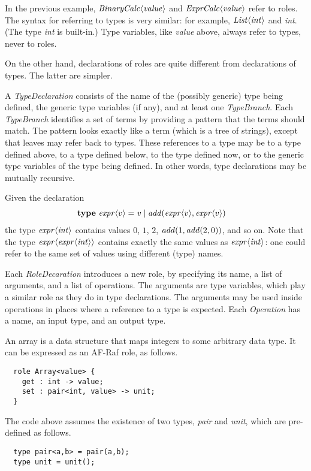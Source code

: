 \documentclass[a4paper,12pt,oneside,fleqn]{book} %
\begin{document}
\begin{example}
In the previous example, $\it BinaryCalc\langle value\rangle$ and $\it
ExprCalc\langle value\rangle$ refer to roles.  The syntax for referring to
types is very similar: for example, $\it List\langle int\rangle$ and {\it
int}. (The type {\it int\/} is built-in.) Type variables, like {\it value}
above, always refer to types, never to roles.
\end{example}

On the other hand, declarations of roles are quite different from
declarations of types. The latter are simpler.

A {\it TypeDeclaration\/} consists of the name of the (possibly generic)
type being defined, the generic type variables (if any), and at least one
{\it TypeBranch}. Each {\it TypeBranch\/} identifies a set of terms by
providing a pattern that the terms should match. The pattern looks exactly
like a term (which is a tree of strings), except that leaves may refer back
to types. These references to a type may be to a type defined above, to a
type defined below, to the type defined now, or to the generic type
variables of the type being defined. In other words, type declarations may
be mutually recursive.

\begin{example}
Given the declaration
\begin{align}
&{\bf type}\ {\it expr}\langle v\rangle
  = {\it v}
  \mid {\it add}({\it expr}\langle v\rangle, {\it expr}\langle v\rangle)
\end{align}
the type ${\it expr}\langle{\it int}\rangle$ contains values $0$, $1$, $2$,
${\it add}(1,{\it add}(2,0))$, and so on. Note that the type ${\it
expr}\langle{\it expr}\langle{\it int}\rangle\rangle$ contains exactly the
same values as ${\it expr}\langle{\it int}\rangle$: one could refer to the
same set of values using different (type) names.
\end{example}

Each {\it RoleDecaration\/} introduces a new role, by specifying its name,
a list of arguments, and a list of operations. The arguments are type
variables, which play a similar role as they do in type declarations. The
arguments may be used inside operations in places where a reference to a
type is expected. Each {\it Operation\/} has a name, an input type, and an
output type.

\begin{example}
An array is a data structure that maps integers to some arbitrary data
type. It can be expressed as an AF-Raf role, as follows.
\begin{verbatim}
  role Array<value> {
    get : int -> value;
    set : pair<int, value> -> unit;
  }
\end{verbatim}
The code above assumes the existence of two types, {\it pair\/} and {\it
unit}, which are pre-defined as follows.
\begin{verbatim}
  type pair<a,b> = pair(a,b);
  type unit = unit();
\end{verbatim}
\end{example}
\end{document}
